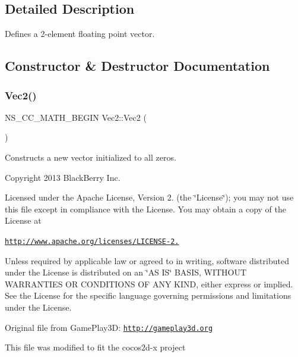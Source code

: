\subsection{Detailed Description}
Defines a 2-\/element floating point vector. 

\subsection{Constructor \& Destructor Documentation}
\mbox{\label{classVec2_a7d3b326498b7ecc18020731109cb4bb8}} 
\subsubsection{\texorpdfstring{Vec2()}{Vec2()}\hspace{0.1cm}{\footnotesize\ttfamily [1/9]}}
{\footnotesize\ttfamily N\+S\+\_\+\+C\+C\+\_\+\+M\+A\+T\+H\+\_\+\+B\+E\+G\+IN Vec2\+::\+Vec2 (\begin{DoxyParamCaption}{ }\end{DoxyParamCaption})\hspace{0.3cm}{\ttfamily [inline]}}

Constructs a new vector initialized to all zeros.

Copyright 2013 Black\+Berry Inc.

Licensed under the Apache License, Version 2. (the \char`\"{}\+License\char`\"{}); you may not use this file except in compliance with the License. You may obtain a copy of the License at

\href{http://www.apache.org/licenses/LICENSE-2.0}{\tt http\+://www.\+apache.\+org/licenses/\+L\+I\+C\+E\+N\+S\+E-\/2.}

Unless required by applicable law or agreed to in writing, software distributed under the License is distributed on an \char`\"{}\+A\+S I\+S\char`\"{} B\+A\+S\+IS, W\+I\+T\+H\+O\+UT W\+A\+R\+R\+A\+N\+T\+I\+ES OR C\+O\+N\+D\+I\+T\+I\+O\+NS OF A\+NY K\+I\+ND, either express or implied. See the License for the specific language governing permissions and limitations under the License.

Original file from Game\+Play3D\+: \href{http://gameplay3d.org}{\tt http\+://gameplay3d.\+org}

This file was modified to fit the cocos2d-\/x project \mbox{\label{classVec2_a8e4727da05d8400e3c7153b76974214c}} 
